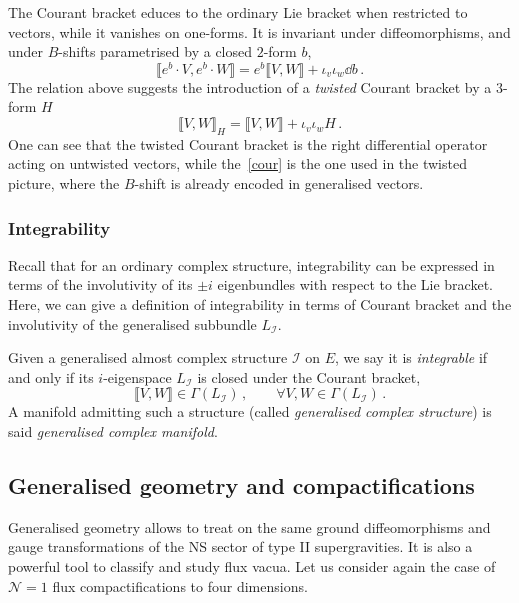 \documentclass[debug]{phd}
\begin{document}
					The Courant bracket educes to the ordinary Lie bracket when restricted to vectors, while it vanishes on one-forms.
					It is invariant under diffeomorphisms, and under $B$-shifts parametrised by a closed $2$-form $b$,
							\begin{equation}\label{bCour}
								\llbracket e^b \cdot V, e^b \cdot W \rrbracket = e^b \llbracket V, W \rrbracket + \iota_v \iota_w \dd b \, .
							\end{equation}
					The relation above suggests the introduction of a \emph{twisted} Courant bracket by a $3$-form $H$
							\begin{equation}\label{HCour}
								 \llbracket V, W \rrbracket_H = \llbracket V, W \rrbracket + \iota_v \iota_w H \, .
							\end{equation}
					One can see that the twisted Courant bracket is the right differential operator acting on untwisted vectors, while the~\eqref{cour} is the one used in the twisted picture, where the $B$-shift is already encoded in generalised vectors.
				\subsubsection{Integrability}
						Recall that for an ordinary complex structure, integrability can be expressed in terms of the involutivity of its $\pm i$ eigenbundles 
						with respect to the Lie bracket.
						Here, we can give a definition of integrability in terms of Courant bracket and the involutivity of the generalised subbundle $L_\mathcal{I}$.
						
						Given a generalised almost complex structure $\mathcal{I}$ on $E$, we say it is \emph{integrable} if and only if its $i$-eigenspace $L_\mathcal{I}$ is closed under the Courant bracket,
								\begin{equation}
									\llbracket V, W \rrbracket \in \Gamma(L_\mathcal{I}) \, , \qquad \forall V, W \in \Gamma(L_\mathcal{I}) \, .
								\end{equation}
						A manifold admitting such a structure (called \emph{generalised complex structure}) is said \emph{generalised complex manifold}.
			
\subsection{Generalised geometry and compactifications} 

Generalised geometry allows to treat on the same ground diffeomorphisms and gauge transformations of the NS sector of type II supergravities. 
It is also a powerful tool to classify and study flux vacua. 
Let us consider again the case of $\mathcal{N}=1$ flux compactifications to four dimensions.
\end{document}

